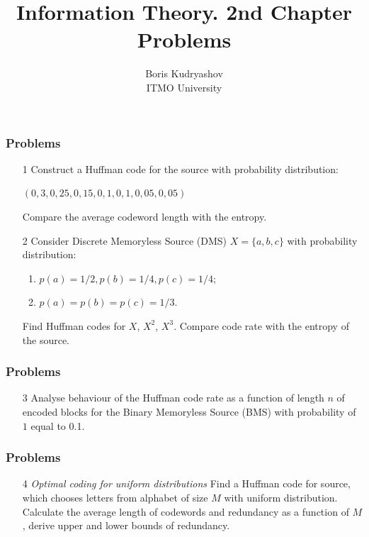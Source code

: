 \documentclass[14pt]{beamer}
\title{\small{Information Theory. 2nd Chapter Problems}}
\author{\huge{
Boris Kudryashov \\
\vspace{30pt}
ITMO University
}}
\begin{document}
\maketitle

\begin{frame}
\frametitle{Problems}
\begin{enumerate}
  \item[1] Construct a  Huffman code for the source with probability distribution:
  
  $(0,3, 0,25, 0,15, 0,1, 0,1, 0,05, 0,05)$
  
  Compare the average codeword length with the entropy.
  \pause \item[2] Consider Discrete Memoryless Source (DMS) $X = \{a, b, c\}$ with probability distribution: 
    \begin{enumerate}
    \item
    $p\left( a \right) = 1/2,p\left( b\right) = 1/4,p\left(c\right)=1/4;$
    \item
    $p\left( a \right) = p\left( b \right) = p\left( c \right) = 1 / 3.$
    \end{enumerate}
  Find Huffman codes for $X$, $X^{2}$, $X^{3}$. Compare code rate with the entropy of the source.
\end{enumerate}
\end{frame}


\begin{frame}
\frametitle{Problems}
\begin{enumerate}

  \item[3] Analyse behaviour of the Huffman code rate as a function of length $n$ of encoded blocks for the Binary Memoryless Source (BMS) with probability of $1$ equal to 0.1.
 
\end{enumerate}
\end{frame}


\begin{frame}
\frametitle{Problems}
\begin{enumerate}

  \item[4] \emph{Optimal coding for uniform distributions} 
  Find a Huffman code for source, which chooses letters from alphabet of size $M$ with uniform distribution. Calculate the average length of codewords and redundancy as a function of $M$, derive upper and lower bounds of redundancy.
  
  \end{enumerate}
\end{frame}
\end{document}
